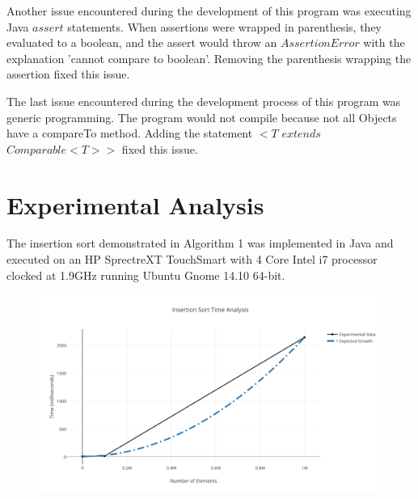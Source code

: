 \documentclass[onecolumn, 12pt, article]{IEEEtran}
\numberwithin{case}{problem}
\numberwithin{condition}{problem}
\numberwithin{condition}{subsection}
\numberwithin{definition}{section}
\theoremstyle{remark}
\numberwithin{question}{problem}
\theoremstyle{plain}
\numberwithin{answer}{problem}
\numberwithin{solution}{section}
\numberwithin{equation}{section}%
\begin{document}
Another issue encountered during the development of this program was executing Java $assert$ statements. When assertions were wrapped in parenthesis, they evaluated to a boolean, and the assert would throw an $AssertionError$ with the explanation 'cannot compare to boolean'. Removing the parenthesis wrapping the assertion fixed this issue.

The last issue encountered during the development process of this program was generic programming. The program would not compile because not all Objects have a compareTo method. Adding the statement $<T$ $extends$ $Comparable<T>>$ fixed this issue. \cite{erik}


\section{Experimental Analysis}
 The insertion sort demonstrated in Algorithm 1 was implemented in Java and executed on an HP SprectreXT TouchSmart with 4 Core Intel i7 processor clocked at 1.9GHz running Ubuntu Gnome 14.10 64-bit.
 \begin{figure}[!]
\begin{center}
\includegraphics[scale=.75]{insertion_sort_time_analysis.pdf}
\end{center}
\label{fig:insertionsorttimeanalysis}
\end{figure}
\end{document}

